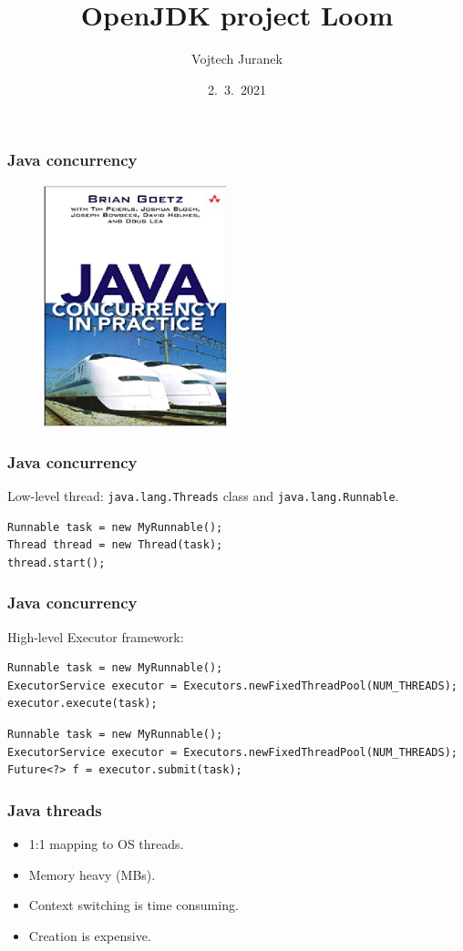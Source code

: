 \documentclass[10pt,utf8]{beamer}
\title{OpenJDK project Loom}
\author{Vojtech Juranek}
\institute[Red Hat]{oVirt storage team}
\date{2.~3.~2021}
\begin{document}
\begin{frame}
	\titlepage
\end{frame}

\begin{frame}
    \frametitle{Java concurrency}
    \begin{figure}
        \centering
        \includegraphics[height=7cm]{./img/jcp.eps}
    \end{figure}
\end{frame}

\begin{frame}[fragile]
    \frametitle{Java concurrency}
    Low-level thread: \texttt{java.lang.Threads} class and \texttt{java.lang.Runnable}.
    \begin{lstlisting}[style=java]
Runnable task = new MyRunnable();
Thread thread = new Thread(task);
thread.start();
    \end{lstlisting}
\end{frame}

\begin{frame}[fragile]
    \frametitle{Java concurrency}
    High-level Executor framework:
    \begin{lstlisting}[style=java]
Runnable task = new MyRunnable();
ExecutorService executor = Executors.newFixedThreadPool(NUM_THREADS);
executor.execute(task);
    \end{lstlisting}
    
    \vspace{0.5cm}
    \begin{lstlisting}[style=java]
Runnable task = new MyRunnable();
ExecutorService executor = Executors.newFixedThreadPool(NUM_THREADS);
Future<?> f = executor.submit(task);
    \end{lstlisting}
\end{frame}

\begin{frame}
    \frametitle{Java threads}
    \begin{itemize}
        \item 1:1 mapping to OS threads.
        \item Memory heavy (MBs).
        \item Context switching is time consuming.
        \item Creation is expensive.
    \end{itemize}
\end{frame}
\end{document}
